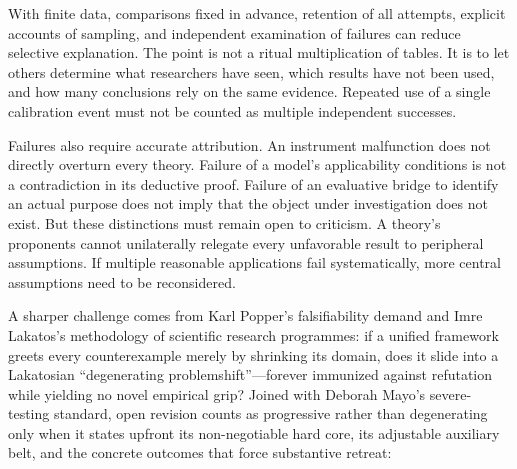\documentclass[
  english,
  11pt,
  oneside]{book}
\begin{document}
With finite data, comparisons fixed in advance, retention of all attempts, explicit accounts of sampling, and independent examination of failures can reduce selective explanation. The point is not a ritual multiplication of tables. It is to let others determine what researchers have seen, which results have not been used, and how many conclusions rely on the same evidence. Repeated use of a single calibration event must not be counted as multiple independent successes.

Failures also require accurate attribution. An instrument malfunction does not directly overturn every theory. Failure of a model's applicability conditions is not a contradiction in its deductive proof. Failure of an evaluative bridge to identify an actual purpose does not imply that the object under investigation does not exist. But these distinctions must remain open to criticism. A theory's proponents cannot unilaterally relegate every unfavorable result to peripheral assumptions. If multiple reasonable applications fail systematically, more central assumptions need to be reconsidered.

A sharper challenge comes from Karl Popper's falsifiability demand and Imre Lakatos's methodology of scientific research programmes: if a unified framework greets every counterexample merely by shrinking its domain, does it slide into a Lakatosian ``degenerating problemshift''---forever immunized against refutation while yielding no novel empirical grip? Joined with Deborah Mayo's severe-testing standard, open revision counts as progressive rather than degenerating only when it states upfront its non-negotiable hard core, its adjustable auxiliary belt, and the concrete outcomes that force substantive retreat:
\end{document}
